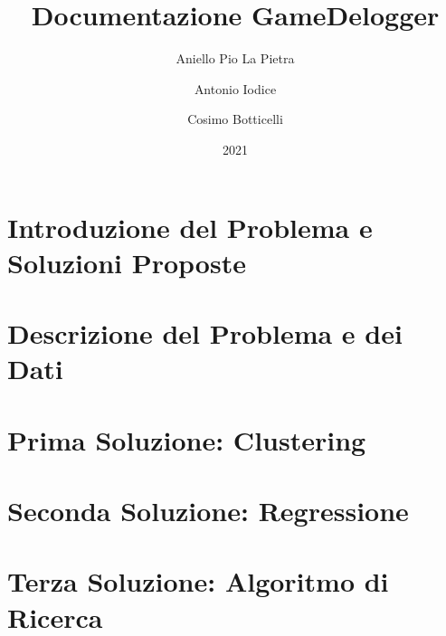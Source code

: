 \documentclass[12pt]{report}
\title{Documentazione GameDelogger}
\author{Aniello Pio La Pietra \and Antonio Iodice \and Cosimo Botticelli}
\date{2021}
\begin{document}
\maketitle
\tableofcontents


\chapter{Introduzione del Problema e Soluzioni Proposte}


\chapter{Descrizione del Problema e dei Dati}


\chapter{Prima Soluzione: Clustering}


\chapter{Seconda Soluzione: Regressione}


\chapter{Terza Soluzione: Algoritmo di Ricerca}

\end{document}
